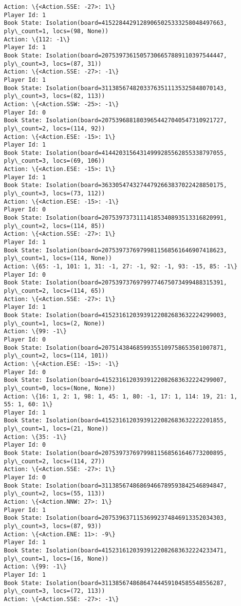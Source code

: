\documentclass[11pt]{article}
\begin{document}
\begin{Verbatim}[commandchars=\\\{\}]
Action: \{<Action.SSE: -27>: 1\}
Player Id: 1
Book State: Isolation(board=41522844291289065025333258048497663, ply\_count=1, locs=(98, None))
Action: \{112: -1\}
Player Id: 1
Book State: Isolation(board=20753973615057306657889110397544447, ply\_count=3, locs=(87, 31))
Action: \{<Action.SSE: -27>: -1\}
Player Id: 1
Book State: Isolation(board=31138567482033763511135325848070143, ply\_count=3, locs=(82, 113))
Action: \{<Action.SSW: -25>: -1\}
Player Id: 0
Book State: Isolation(board=20753968818039654427040547310921727, ply\_count=2, locs=(114, 92))
Action: \{<Action.ESE: -15>: 1\}
Player Id: 1
Book State: Isolation(board=41442031564314999285562855338797055, ply\_count=3, locs=(69, 106))
Action: \{<Action.ESE: -15>: 1\}
Player Id: 1
Book State: Isolation(board=36330547432744792663837022428850175, ply\_count=3, locs=(73, 112))
Action: \{<Action.ESE: -15>: -1\}
Player Id: 0
Book State: Isolation(board=20753973731114185340893513316820991, ply\_count=2, locs=(114, 85))
Action: \{<Action.SSE: -27>: 1\}
Player Id: 1
Book State: Isolation(board=20753973769799811568561646907418623, ply\_count=1, locs=(114, None))
Action: \{65: -1, 101: 1, 31: -1, 27: -1, 92: -1, 93: -15, 85: -1\}
Player Id: 0
Book State: Isolation(board=20753973769799774675073499488315391, ply\_count=2, locs=(114, 65))
Action: \{<Action.SSE: -27>: 1\}
Player Id: 1
Book State: Isolation(board=41523161203939122082683632224299003, ply\_count=1, locs=(2, None))
Action: \{99: -1\}
Player Id: 0
Book State: Isolation(board=20751438468599355109758653501007871, ply\_count=2, locs=(114, 101))
Action: \{<Action.ESE: -15>: -1\}
Player Id: 0
Book State: Isolation(board=41523161203939122082683632224299007, ply\_count=0, locs=(None, None))
Action: \{16: 1, 2: 1, 98: 1, 45: 1, 80: -1, 17: 1, 114: 19, 21: 1, 55: 1, 60: 1\}
Player Id: 1
Book State: Isolation(board=41523161203939122082683632222201855, ply\_count=1, locs=(21, None))
Action: \{35: -1\}
Player Id: 0
Book State: Isolation(board=20753973769799811568561646773200895, ply\_count=2, locs=(114, 27))
Action: \{<Action.SSE: -27>: 1\}
Player Id: 0
Book State: Isolation(board=31138567486869466789593842546894847, ply\_count=2, locs=(55, 113))
Action: \{<Action.NNW: 27>: 1\}
Player Id: 1
Book State: Isolation(board=20753963711536992374846913352034303, ply\_count=3, locs=(87, 93))
Action: \{<Action.ENE: 11>: -9\}
Player Id: 1
Book State: Isolation(board=41523161203939122082683632224233471, ply\_count=1, locs=(16, None))
Action: \{99: -1\}
Player Id: 1
Book State: Isolation(board=31138567486864744459104585548556287, ply\_count=3, locs=(72, 113))
Action: \{<Action.SSE: -27>: -1\}

\end{Verbatim}
\end{document}
